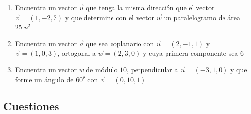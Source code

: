 \begin{enumerate}
\vspace{2mm}

\item Encuentra un vector $\vec u$ que tenga la misma dirección que el vector $\vec v=(1,-2,3)$ y que determine con el vector $\vec w$ un paralelogramo de área $25 \; u^2$

\vspace{2mm}

\item Encuentra un vector $\vec a$ que sea coplanario con $\vec u=(2,-1,1)$ y $\vec v=(1,0,3)$, ortogonal a $\vec w=(2,3,0)$ y cuya primera componente sea $6$ 

\vspace{2mm}

\item Encuentra un vector $\vec w$ de módulo $10$, perpendicular a $\vec u=(-3,1,0)$ y que forme un ángulo de $60^o$ con $\vec v=(0,10,1)$

\vspace{2mm}

\end{enumerate}

\subsection{Cuestiones}

